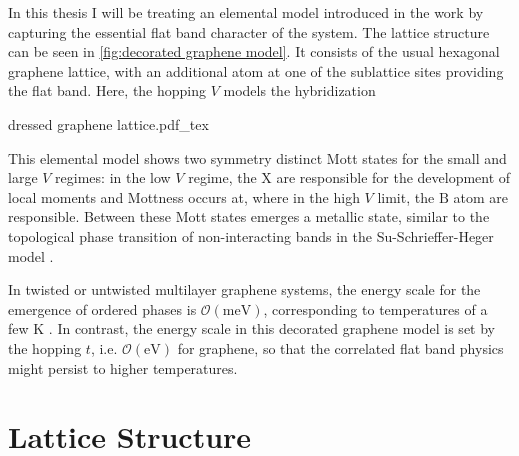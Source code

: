 \documentclass[../main.tex]{subfiles}
\begin{document}
In this thesis I will be treating an elemental model introduced in the work by \citeauthor{wittQuantumGeometryLocal2025} capturing the essential flat band character of the system.
The lattice structure can be seen in \cref{fig:decorated graphene model}.
It consists of the usual hexagonal graphene lattice, with an additional atom at one of the sublattice sites providing the flat band.
Here, the hopping \(V\) models the hybridization 
\begin{SCfigure}[50][t]
	\centering
	{dressed graphene lattice.pdf_tex}
	\caption[Lattice structure of decorated graphene honeycomb lattice.]{\textbf{Lattice structure of decorated graphene honeycomb lattice.} with impurity X hybridized to sublattice site A. There is only hopping \(t\) between sublattices \(\mathrm{A}\) and \(\mathrm{B}\) as well as \(V\) between \(\mathrm{X}\) and \(\mathrm{A}\) atoms. Created using VESTA \cite{mommaVESTA3Threedimensional2011}.}
	\label{fig:decorated graphene model}
\end{SCfigure}

This elemental model shows two symmetry distinct Mott states for the small and large \(V\) regimes: in the low \(V\) regime, the \(\mathrm{X}\) are responsible for the development of local moments and Mottness occurs at, where in the high \(V\) limit, the \(\mathrm{B}\) atom are responsible.
Between these Mott states emerges a metallic state, similar to the topological phase transition of non-interacting bands in the Su-Schrieffer-Heger model \cite{suSolitonExcitationsPolyacetylene1980}.

In twisted or untwisted multilayer graphene systems, the energy scale for the emergence of ordered phases is \(\mathcal{O} (\unit{\milli\electronvolt})\), corresponding to temperatures of a few \unit{\kelvin} \cite{nuckollsMicroscopicPerspectiveMoire2024, pantaleonSuperconductivityCorrelatedPhases2023a}.
In contrast, the energy scale in this decorated graphene model is set by the hopping \(t\), i.e. \(\mathcal{O} (\unit{\electronvolt})\) for graphene, so that the correlated flat band physics might persist to higher temperatures.

\section{Lattice Structure}\label{sec:lattice and band structure}
\end{document}
